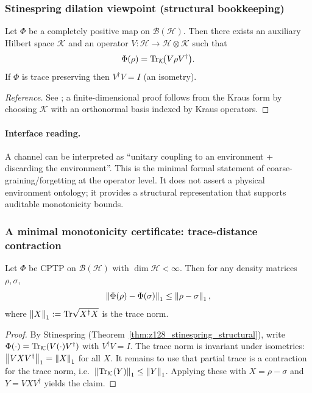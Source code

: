 \subsubsection{Stinespring dilation viewpoint (structural bookkeeping)}
\begin{theorem}
\label{thm:z128_stinespring_structural}
Let $\Phi$ be a completely positive map on $\mathcal{B}(\mathcal{H})$.
Then there exists an auxiliary Hilbert space $\mathcal{K}$ and an operator $V:\mathcal{H}\to\mathcal{H}\otimes\mathcal{K}$ such that
\[
\Phi(\rho)=\mathrm{Tr}_{\mathcal{K}}\!\bigl(V\rho V^\dagger\bigr).
\]
If $\Phi$ is trace preserving then $V^\dagger V=I$ (an isometry).
\end{theorem}
\begin{proof}[Reference]
See \cite{Stinespring1955}; a finite-dimensional proof follows from the Kraus form by choosing $\mathcal{K}$ with an orthonormal basis indexed by Kraus operators.
\end{proof}

\paragraph{Interface reading.}
\InterfaceTag A channel can be interpreted as ``unitary coupling to an environment + discarding the environment''.
This is the minimal formal statement of coarse-graining/forgetting at the operator level.
It does not assert a physical environment ontology; it provides a structural representation that supports auditable monotonicity bounds.

\subsubsection{A minimal monotonicity certificate: trace-distance contraction}
\begin{proposition}
\label{prop:z128_trace_distance_contraction}
Let $\Phi$ be CPTP on $\mathcal{B}(\mathcal{H})$ with $\dim\mathcal{H}<\infty$.
Then for any density matrices $\rho,\sigma$,
\[
\left\lVert \Phi(\rho)-\Phi(\sigma)\right\rVert_1 \le \left\lVert \rho-\sigma\right\rVert_1,
\]
where $\left\lVert X\right\rVert_1:=\mathrm{Tr}\sqrt{X^\dagger X}$ is the trace norm.
\end{proposition}
\begin{proof}
By Stinespring (Theorem~\ref{thm:z128_stinespring_structural}), write $\Phi(\cdot)=\mathrm{Tr}_{\mathcal{K}}(V(\cdot)V^\dagger)$ with $V^\dagger V=I$.
The trace norm is invariant under isometries: $\left\lVert VXV^\dagger\right\rVert_1=\left\lVert X\right\rVert_1$ for all $X$.
It remains to use that partial trace is a contraction for the trace norm, i.e.\ $\left\lVert \mathrm{Tr}_{\mathcal{K}}(Y)\right\rVert_1\le\left\lVert Y\right\rVert_1$.
Applying these with $X=\rho-\sigma$ and $Y=VXV^\dagger$ yields the claim.
\end{proof}

